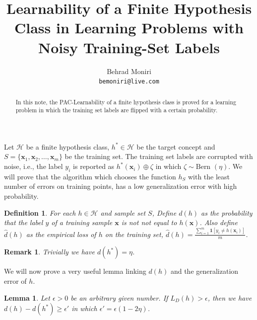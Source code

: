 \documentclass[]{article}
\title{Learnability of a Finite Hypothesis Class in Learning Problems with Noisy Training-Set Labels}
\author{Behrad Moniri\\\texttt{bemoniri@live.com}}
\date{}
\newtheorem{lemma}[theorem]{Lemma}
\newtheorem{defn}[theorem]{Definition}
\newtheorem{remark}[theorem]{Remark}
\newcommand{\bx}{\mathbf{x}}
\newcommand{\cH}{\mathcal{H}}
\begin{document}
	\setcounter{section}{-1}
	\maketitle
	
	\begin{abstract}
		In this note, the PAC-Learnability of a finite hypothesis class is proved for a learning problem in which the training set labels are flipped with a certain probability.
	\end{abstract}
	
	Let $\cH$ be a finite hypothesis class, $h^*\in \cH$ be the target concept and $S = \{\bx_1, \bx_2, \dots, \bx_m\}$ be the training set. The training set labels are corrupted with noise, i.e., the label $y_i$ is reported as $h^*(\bx_i) \oplus \zeta$ in which $\zeta \sim \text{Bern }(\eta)$.  We will prove that the algorithm which chooses the function $h_S$ with the least number of errors on training points, has a low generalization error with high probability.
	
	\begin{defn}
		For each $h\in \cH$ and sample set $S$, Define $d(h)$ as the probability that the label $y$ of a training sample $\bx$ is not not equal to $h(\bx)$. Also define $\hat{d}(h)$ as the empirical loss of $h$ on the training set, 
		$\hat{d}(h) = \frac{\sum_{i = 1}^{m} \mathbf{1}[y_i \neq h(\bx_i) ]}{m}$.
	\end{defn}
	
	\begin{remark}
		Trivially we have $d(h^*) = \eta$.
	\end{remark}
	
	
	We will now prove a very useful lemma linking $d(h)$ and the generalization error of $h$.
	\begin{lemma}
		\label{lem}
		Let $\epsilon>0$ be an arbitrary given number. If $L_D(h)>\epsilon$, then we have $d(h) - d(h^*) \geq \epsilon'$ in which $\epsilon' = \epsilon(1-2\eta)$.
	\end{lemma}
	
\end{document}
